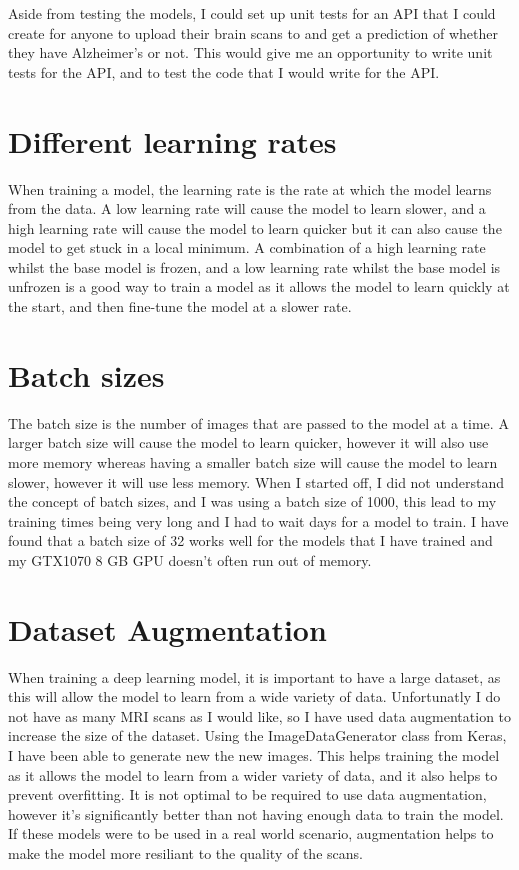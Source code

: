 \documentclass[]{final_report}
\begin{document}
Aside from testing the models, I could set up unit tests for an API that I could create for anyone to upload their brain scans to and get a prediction of whether they have Alzheimer's or not.
This would give me an opportunity to write unit tests for the API, and to test the code that I would write for the API.

\section{Different learning rates}

When training a model, the learning rate is the rate at which the model learns from the data.
A low learning rate will cause the model to learn slower, and a high learning rate will cause the model to learn quicker
but it can also cause the model to get stuck in a local minimum. A combination of a high learning rate whilst the base model is frozen,
and a low learning rate whilst the base model is unfrozen is a good way to train a model as it allows the model to learn quickly at the start,
and then fine-tune the model at a slower rate. 


\section{Batch sizes}

The batch size is the number of images that are passed to the model at a time.
A larger batch size will cause the model to learn quicker, however it will also use more memory whereas
having a smaller batch size will cause the model to learn slower, however it will use less memory.
When I started off, I did not understand the concept of batch sizes, and I was using a batch size of 1000, this lead to my training times
being very long and I had to wait days for a model to train.
I have found that a batch size of 32 works well for the models that I have trained and my GTX1070 8 GB GPU\cite{GTX1070} doesn't often run out of memory.

\section{Dataset Augmentation}

When training a deep learning model, it is important to have a large dataset, as this will allow the model to learn from a wide variety of data.
Unfortunatly I do not have as many MRI scans as I would like, so I have used data augmentation to increase the size of the dataset.
Using the ImageDataGenerator class from Keras\cite{Keras}, I have been able to generate new the new images.
This helps training the model as it allows the model to learn from a wider variety of data, and it also helps to prevent overfitting.
It is not optimal to be required to use data augmentation, however it's significantly better than not having enough data to train the model.
If these models were to be used in a real world scenario, augmentation helps to make the model more resiliant to the quality of the scans.
\end{document}
